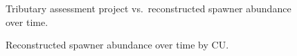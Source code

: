 \documentclass[11pt]{book}
\begin{document}
\begin{figure}[htb]

{\centering {} 

}

\caption{Tributary assessment project vs.~reconstructed spawner abundance over time.}\label{fig:fig-trib-vs-CU-spawn}
\end{figure}

\begin{figure}[htb]

{\centering {} 

}

\caption{Reconstructed spawner abundance over time by CU.}\label{fig:fig-CU-spawn}
\end{figure}
\end{document}
